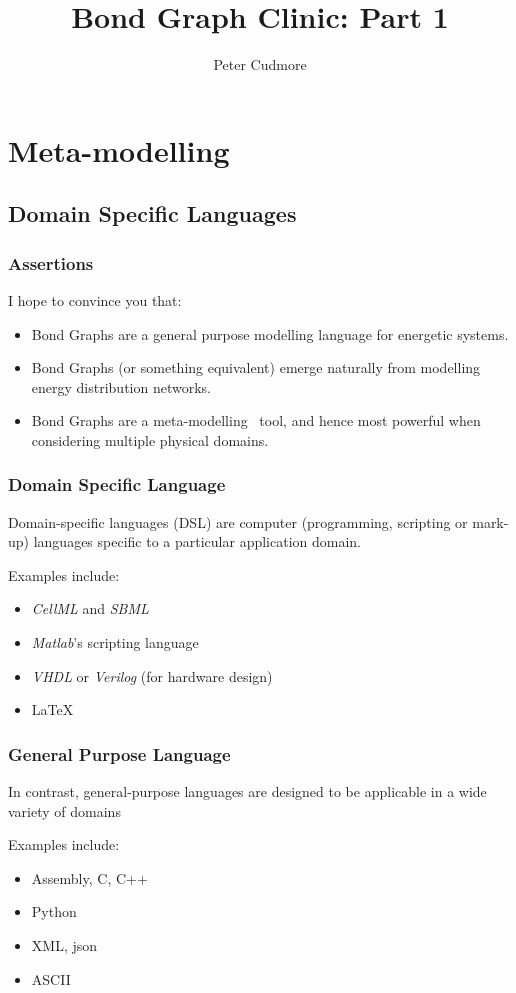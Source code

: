 \documentclass[11pt,reqno]{beamer}
\title{Bond Graph Clinic: Part 1}
\author{Peter Cudmore}
\institute{Systems Biology Lab, The University of Melbourne}
\begin{document}
	\begin{frame}
	\titlepage
	\addtocounter{framenumber}{-1} 
\end{frame}
\begin{frame}
\tableofcontents[hideallsubsections]
\end{frame}
\section{Meta-modelling}
\subsection{Domain Specific Languages}
\begin{frame}
\frametitle{Assertions}
I hope to convince you that:
\begin{itemize}
	\item Bond Graphs are a general purpose modelling language for energetic systems.
	\item Bond Graphs (or something equivalent) emerge naturally from modelling energy distribution networks.
	\item Bond Graphs are a meta-modelling~\cite{gaw96} tool, and hence most powerful when considering multiple physical domains.
\end{itemize}
\end{frame}
\begin{frame}
\frametitle{Domain Specific Language}
Domain-specific languages (DSL) are computer (programming, scripting or mark-up) languages specific to a particular application domain.\\
\vspace{20pt}

Examples include: 
\begin{itemize}
	\item \emph{CellML} and \emph{SBML}
	\item \emph{Matlab}'s scripting language
	\item \emph{VHDL} or \emph{Verilog} (for hardware design)
	\item \LaTeX
\end{itemize}
\end{frame}
\begin{frame}
\frametitle{General Purpose Language}
In contrast, general-purpose languages are designed to be applicable in a wide variety of domains
\vspace{20pt}

Examples include: 
\begin{itemize}
	\item Assembly, C, C++
	\item Python
	\item XML, json
	\item ASCII  
\end{itemize}
\end{frame}
\end{document}
